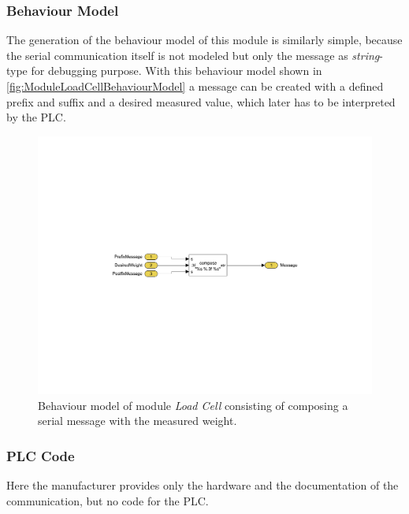     \subsubsection{Behaviour Model}
    The generation of the behaviour model of this module is similarly simple, because the serial communication itself is not modeled but only the message as \textit{string}-type for debugging purpose. With this behaviour model shown in \autoref{fig:ModuleLoadCellBehaviourModel} a message can be created with a defined prefix and suffix and a desired measured value, which later has to be interpreted by the PLC.
	\begin{figure}[htp]
		\centering
		\includegraphics[trim=60mm 95mm 60mm 95mm, clip, width=0.65\linewidth]{figures/BehaviourModelLoadCell.pdf}
		\caption[Behaviour model of module \textit{Load Cell}.]{Behaviour model of module \textit{Load Cell} consisting of composing a serial message with the measured weight.}
		\label{fig:ModuleLoadCellBehaviourModel}
	\end{figure}
	
	\subsubsection{PLC Code}
	Here the manufacturer provides only the hardware and the documentation of the communication, but no code for the PLC. 
	
